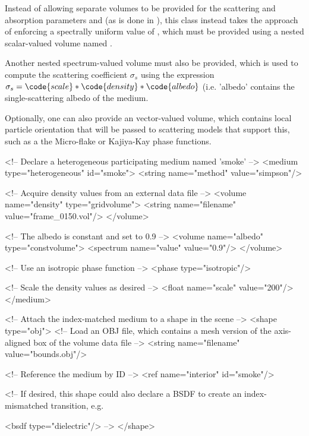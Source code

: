 Instead of allowing separate volumes to be provided for the scattering
and absorption parameters  and  (as is done in
), this class instead takes the approach of
enforcing a spectrally uniform value of , which must be
provided using a nested scalar-valued volume named .

Another nested spectrum-valued  volume must also be provided, which is
used to compute the scattering coefficient $\sigma_s$ using the expression
$\sigma_s = \code{scale} * \code{density} * \code{albedo}$ (i.e. 'albedo' contains the
single-scattering albedo of the medium.

Optionally, one can also provide an vector-valued  volume,
which contains local particle orientation that will be passed to
scattering models that support this, such as a the Micro-flake or
Kajiya-Kay phase functions.

\vspace{4mm}

\begin{xml}[label=lst:hetvolume,caption=A simple heterogeneous medium backed by a grid volume]
<!-- Declare a heterogeneous participating medium named 'smoke' -->
<medium type="heterogeneous" id="smoke">
    <string name="method" value="simpson"/>

    <!-- Acquire density values from an external data file -->
    <volume name="density" type="gridvolume">
        <string name="filename" value="frame_0150.vol"/>
    </volume>

    <!-- The albedo is constant and set to 0.9 -->
    <volume name="albedo" type="constvolume">
        <spectrum name="value" value="0.9"/>
    </volume>

    <!-- Use an isotropic phase function -->
    <phase type="isotropic"/>

    <!-- Scale the density values as desired -->
    <float name="scale" value="200"/>
 </medium>

<!-- Attach the index-matched medium to a shape in the scene -->
<shape type="obj">
    <!-- Load an OBJ file, which contains a mesh version
         of the axis-aligned box of the volume data file -->
    <string name="filename" value="bounds.obj"/>

    <!-- Reference the medium by ID -->
    <ref name="interior" id="smoke"/>

    <!-- If desired, this shape could also declare
         a BSDF to create an index-mismatched
         transition, e.g.

    <bsdf type="dielectric"/>
    -->
</shape>
\end{xml}


